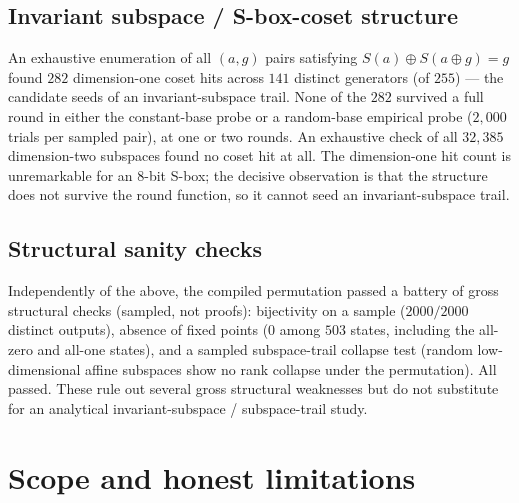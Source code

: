 \documentclass[11pt]{article}
\newcommand{\sbx}{S\nobreakdash-box}
\begin{document}
\subsection{Invariant subspace / \sbx-coset structure}
An exhaustive enumeration of all $(a,g)$ pairs satisfying $S(a)\oplus S(a\oplus
g)=g$ found $282$ dimension-one coset hits across $141$ distinct generators (of
$255$) --- the candidate seeds of an invariant-subspace trail. None of the $282$
survived a full round in either the constant-base probe or a random-base
empirical probe ($2{,}000$ trials per sampled pair), at one or two rounds. An
exhaustive check of all $32{,}385$ dimension-two subspaces found no coset hit at
all. The dimension-one hit count is unremarkable for an $8$-bit \sbx; the
decisive observation is that the structure does not survive the round function,
so it cannot seed an invariant-subspace trail.

\subsection{Structural sanity checks}
Independently of the above, the compiled permutation passed a battery of gross
structural checks (sampled, not proofs): bijectivity on a sample
($2000/2000$ distinct outputs), absence of fixed points ($0$ among $503$ states,
including the all-zero and all-one states), and a sampled subspace-trail collapse
test (random low-dimensional affine subspaces show no rank collapse under the
permutation). All passed. These rule out several gross structural weaknesses but
do not substitute for an analytical invariant-subspace / subspace-trail study.

\section{Scope and honest limitations}
\end{document}
